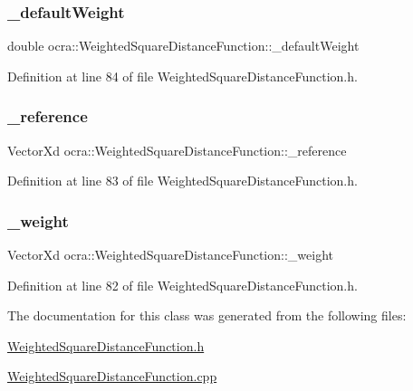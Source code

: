 \subsubsection{\texorpdfstring{\+\_\+default\+Weight}{\_defaultWeight}}
{\footnotesize\ttfamily double ocra\+::\+Weighted\+Square\+Distance\+Function\+::\+\_\+default\+Weight\hspace{0.3cm}{\ttfamily [protected]}}



Definition at line 84 of file Weighted\+Square\+Distance\+Function.\+h.

\hypertarget{classocra_1_1WeightedSquareDistanceFunction_a29e7d4c1ce99abef4f2196f11f0de9de}{}\label{classocra_1_1WeightedSquareDistanceFunction_a29e7d4c1ce99abef4f2196f11f0de9de} 
\subsubsection{\texorpdfstring{\+\_\+reference}{\_reference}}
{\footnotesize\ttfamily Vector\+Xd ocra\+::\+Weighted\+Square\+Distance\+Function\+::\+\_\+reference\hspace{0.3cm}{\ttfamily [protected]}}



Definition at line 83 of file Weighted\+Square\+Distance\+Function.\+h.

\hypertarget{classocra_1_1WeightedSquareDistanceFunction_a0363490acdf9ea0bbfc29e0721a757ed}{}\label{classocra_1_1WeightedSquareDistanceFunction_a0363490acdf9ea0bbfc29e0721a757ed} 
\subsubsection{\texorpdfstring{\+\_\+weight}{\_weight}}
{\footnotesize\ttfamily Vector\+Xd ocra\+::\+Weighted\+Square\+Distance\+Function\+::\+\_\+weight\hspace{0.3cm}{\ttfamily [protected]}}



Definition at line 82 of file Weighted\+Square\+Distance\+Function.\+h.



The documentation for this class was generated from the following files\+:\begin{DoxyCompactItemize}
\item 
\hyperlink{WeightedSquareDistanceFunction_8h}{Weighted\+Square\+Distance\+Function.\+h}\item 
\hyperlink{WeightedSquareDistanceFunction_8cpp}{Weighted\+Square\+Distance\+Function.\+cpp}\end{DoxyCompactItemize}
